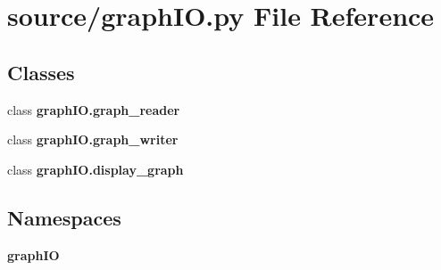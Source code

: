 \section{source/graph\+IO.py File Reference}
\label{graph_i_o_8py}
\subsection*{Classes}
\begin{DoxyCompactItemize}
\item 
class \textbf{ graph\+I\+O.\+graph\+\_\+reader}
\item 
class \textbf{ graph\+I\+O.\+graph\+\_\+writer}
\item 
class \textbf{ graph\+I\+O.\+display\+\_\+graph}
\end{DoxyCompactItemize}
\subsection*{Namespaces}
\begin{DoxyCompactItemize}
\item 
 \textbf{ graph\+IO}
\end{DoxyCompactItemize}
